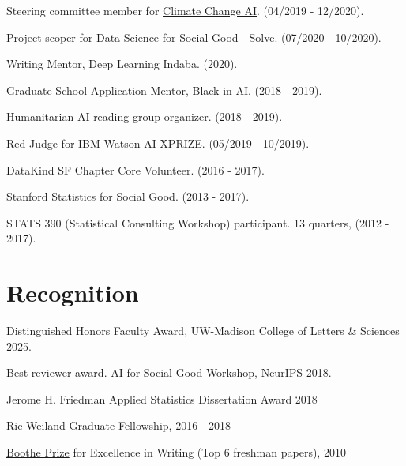 \documentclass[letterpaper]{article}
\renewenvironment{itemize}{
  \begin{list}{}{
    \setlength{\leftmargin}{1.5em}
  }
}{
  \end{list}
}
\begin{document}
\begin{itemize}
\item Steering committee member for \href{https://www.climatechange.ai}{Climate
Change AI}. (04/2019 - 12/2020).
\item Project scoper for Data Science for Social Good - Solve. (07/2020 - 10/2020).
\item Writing Mentor, Deep Learning Indaba. (2020).
\item Graduate School Application Mentor, Black in AI. (2018 - 2019).
\item Humanitarian AI \href{https://krisrs1128.github.io/Humanitarian-AI/}{reading group} organizer. (2018 - 2019).
\item Red Judge for IBM Watson AI XPRIZE. (05/2019 - 10/2019).
\item DataKind SF Chapter Core Volunteer. (2016 - 2017).
\item Stanford Statistics for Social Good. (2013 - 2017).
\item STATS 390 (Statistical Consulting Workshop) participant. 13 quarters, (2012 - 2017).
\end{itemize}

\section*{Recognition}
\begin{itemize}
\item \href{https://honors.ls.wisc.edu/distinguished-honors-faculty-award/}{Distinguished Honors Faculty Award}, UW-Madison College of Letters \& Sciences 2025.
\item Best reviewer award. AI for Social Good Workshop, NeurIPS 2018.
\item Jerome H. Friedman Applied Statistics Dissertation Award 2018
\item Ric Weiland Graduate Fellowship, 2016 - 2018
\item \href{https://undergrad.stanford.edu/programs/pwr/publications-prizes-and-awards/boothe-prize-essays}{Boothe Prize} for Excellence in Writing (Top 6 freshman papers), 2010
\end{itemize}
\end{document}
